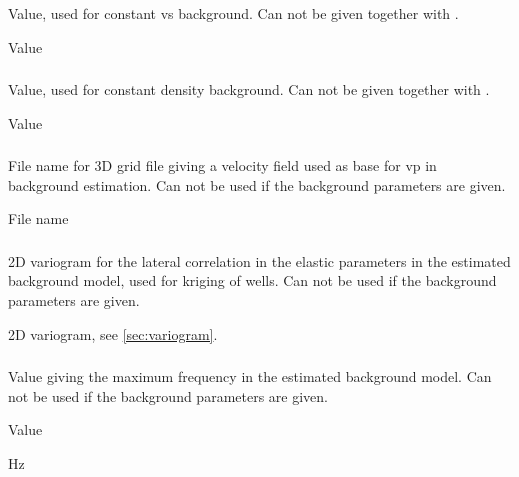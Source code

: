 \subsubsection{}
 \slist
   \item \Description Value, used for constant vs background. Can not be given together with .
   \item \Argument Value
   \item \Default
 \elist

\subsubsection{}
 \slist
   \item \Description Value, used for constant density background. Can not be given together with .
   \item \Argument Value
   \item \Default
 \elist

\subsubsection{}
 \slist
   \item \Description File name for 3D grid file giving a velocity field used as base for vp in background estimation. Can not be used if the background parameters are given.
   \item \Argument File name
   \item \Default
 \elist

\subsubsection{}
 \slist
   \item \Description 2D variogram for the lateral correlation in the elastic parameters in the estimated background model, used for kriging of wells. Can not be used if the background parameters are given.
   \item \Argument 2D variogram, see \autoref{sec:variogram}.
   \item \Default
 \elist

\subsubsection{}
 \slist
   \item \Description Value giving the maximum frequency in the estimated background model. Can not be used if the background parameters are given.
   \item \Argument Value
   \item {} Hz
 \elist


